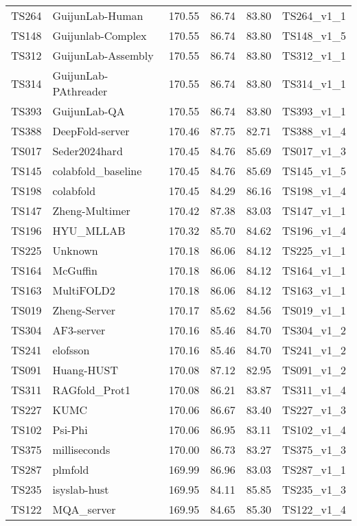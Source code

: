\begin{longtable}{llllll}
TS264 & GuijunLab-Human & 170.55 & 86.74 & 83.80 & TS264\_v1\_1 \\ 
TS148 & Guijunlab-Complex & 170.55 & 86.74 & 83.80 & TS148\_v1\_5 \\ 
TS312 & GuijunLab-Assembly & 170.55 & 86.74 & 83.80 & TS312\_v1\_1 \\ 
TS314 & GuijunLab-PAthreader & 170.55 & 86.74 & 83.80 & TS314\_v1\_1 \\ 
TS393 & GuijunLab-QA & 170.55 & 86.74 & 83.80 & TS393\_v1\_1 \\ 
TS388 & DeepFold-server & 170.46 & 87.75 & 82.71 & TS388\_v1\_4 \\ 
TS017 & Seder2024hard & 170.45 & 84.76 & 85.69 & TS017\_v1\_3 \\ 
TS145 & colabfold\_baseline & 170.45 & 84.76 & 85.69 & TS145\_v1\_5 \\ 
TS198 & colabfold & 170.45 & 84.29 & 86.16 & TS198\_v1\_4 \\ 
TS147 & Zheng-Multimer & 170.42 & 87.38 & 83.03 & TS147\_v1\_1 \\ 
TS196 & HYU\_MLLAB & 170.32 & 85.70 & 84.62 & TS196\_v1\_4 \\ 
TS225 & Unknown & 170.18 & 86.06 & 84.12 & TS225\_v1\_1 \\ 
TS164 & McGuffin & 170.18 & 86.06 & 84.12 & TS164\_v1\_1 \\ 
TS163 & MultiFOLD2 & 170.18 & 86.06 & 84.12 & TS163\_v1\_1 \\ 
TS019 & Zheng-Server & 170.17 & 85.62 & 84.56 & TS019\_v1\_1 \\ 
TS304 & AF3-server & 170.16 & 85.46 & 84.70 & TS304\_v1\_2 \\ 
TS241 & elofsson & 170.16 & 85.46 & 84.70 & TS241\_v1\_2 \\ 
TS091 & Huang-HUST & 170.08 & 87.12 & 82.95 & TS091\_v1\_2 \\ 
TS311 & RAGfold\_Prot1 & 170.08 & 86.21 & 83.87 & TS311\_v1\_4 \\ 
TS227 & KUMC & 170.06 & 86.67 & 83.40 & TS227\_v1\_3 \\ 
TS102 & Psi-Phi & 170.06 & 86.95 & 83.11 & TS102\_v1\_4 \\ 
TS375 & milliseconds & 170.00 & 86.73 & 83.27 & TS375\_v1\_3 \\ 
TS287 & plmfold & 169.99 & 86.96 & 83.03 & TS287\_v1\_1 \\ 
TS235 & isyslab-hust & 169.95 & 84.11 & 85.85 & TS235\_v1\_3 \\ 
TS122 & MQA\_server & 169.95 & 84.65 & 85.30 & TS122\_v1\_4 \\ 

\end{longtable}
